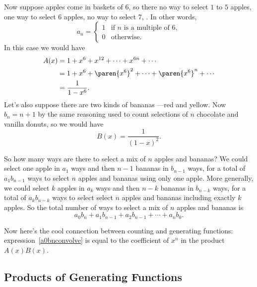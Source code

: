 Now suppose apples come in baskets of 6, so there no way to select $1$
to $5$ apples, one way to select 6 apples, no way to select 7, \etc.
In other words,
\[
a_n = \begin{cases}
      1 & \text{if $n$ is a multiple of 6},\\
      0 & \text{otherwise}.
\end{cases}
\]
In this case we would have
\begin{align*}
A(x)
& = 1 + x^6 + x^{12} + \cdots + x^{6n} + \cdots\\
& = 1 + x^6 + \paren{x^6}^2 + \cdots +\paren{x^6}^n + \cdots\\
& = \frac{1}{1 - x^6}.
\end{align*}
Let's also suppose there are two kinds of bananas ---red and yellow.
Now $b_n = n+1$ by the same reasoning used to count selections of $n$
chocolate and vanilla donuts, so we would have
\[
B(x) = \frac{1}{(1-x)^2}.
\]

So how many ways are there to select a mix of $n$ apples and bananas?
We could select one apple in $a_1$ ways and then $n-1$ bananas in
$b_{n-1}$ ways, for a total of $a_1b_{n-1}$ ways to select $n$ apples
and bananas using only one apple.  More generally, we could select $k$
apples in $a_k$ ways and then $n-k$ bananas in $b_{n-k}$ ways, for a
total of $a_kb_{n-k}$ ways to select select $n$ apples and bananas
including exactly $k$ apples.  So the total number of ways to select a
mix of $n$ apples and bananas is
\begin{equation}\label{a0bnconvolve}
a_0b_n + a_1b_{n-1} + a_2b_{n-1} + \cdots + a_nb_0.
\end{equation}

Now here's the cool connection between counting and generating
functions: expression~\eqref{a0bnconvolve} is equal to the coefficient
of $x^n$ in the product $A(x)B(x)$.

\subsection{Products of Generating Functions}

